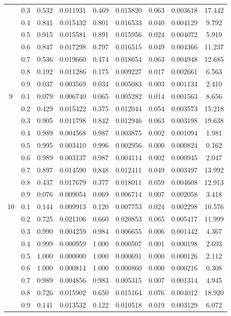 \begin{longtable}{ | c | c || c | c | c | c | c | c | c | }
 & 0.3 & 0.532 & 0.011931 & 0.469 & 0.015820 & 0.063 & 0.003618 & 17.442 \\
 & 0.4 & 0.841 & 0.015432 & 0.801 & 0.016533 & 0.040 & 0.004129 & 9.792 \\
 & 0.5 & 0.915 & 0.015581 & 0.891 & 0.015956 & 0.024 & 0.004072 & 5.919 \\
 & 0.6 & 0.847 & 0.017298 & 0.797 & 0.016515 & 0.049 & 0.004366 & 11.237 \\
 & 0.7 & 0.536 & 0.019660 & 0.474 & 0.018654 & 0.063 & 0.004948 & 12.685 \\
 & 0.8 & 0.192 & 0.011286 & 0.175 & 0.009227 & 0.017 & 0.002661 & 6.563 \\
 & 0.9 & 0.037 & 0.003569 & 0.034 & 0.005083 & 0.003 & 0.001134 & 2.410 \\
 \hline
\multirow{9}{*}{9} & 0.1 & 0.079 & 0.006740 & 0.065 & 0.005282 & 0.014 & 0.001563 & 8.656 \\
 & 0.2 & 0.429 & 0.015422 & 0.375 & 0.012044 & 0.054 & 0.003573 & 15.218 \\
 & 0.3 & 0.905 & 0.011798 & 0.842 & 0.012946 & 0.063 & 0.003198 & 19.638 \\
 & 0.4 & 0.989 & 0.004568 & 0.987 & 0.003875 & 0.002 & 0.001094 & 1.981 \\
 & 0.5 & 0.995 & 0.003410 & 0.996 & 0.002956 & 0.000 & 0.000824 & 0.162 \\
 & 0.6 & 0.989 & 0.003137 & 0.987 & 0.004114 & 0.002 & 0.000945 & 2.047 \\
 & 0.7 & 0.897 & 0.014590 & 0.848 & 0.012411 & 0.049 & 0.003497 & 13.992 \\
 & 0.8 & 0.437 & 0.017679 & 0.377 & 0.018011 & 0.059 & 0.004608 & 12.913 \\
 & 0.9 & 0.076 & 0.009054 & 0.069 & 0.006714 & 0.007 & 0.002058 & 3.418 \\
 \hline
\multirow{9}{*}{10} & 0.1 & 0.144 & 0.009913 & 0.120 & 0.007753 & 0.024 & 0.002298 & 10.576 \\
 & 0.2 & 0.725 & 0.021106 & 0.660 & 0.020853 & 0.065 & 0.005417 & 11.999 \\
 & 0.3 & 0.990 & 0.004259 & 0.984 & 0.006655 & 0.006 & 0.001442 & 4.367 \\
 & 0.4 & 0.999 & 0.000959 & 1.000 & 0.000507 & 0.001 & 0.000198 & 2.693 \\
 & 0.5 & 1.000 & 0.000000 & 1.000 & 0.000691 & 0.000 & 0.000126 & 2.112 \\
 & 0.6 & 1.000 & 0.000814 & 1.000 & 0.000860 & 0.000 & 0.000216 & 0.308 \\
 & 0.7 & 0.989 & 0.004856 & 0.983 & 0.005315 & 0.007 & 0.001314 & 4.945 \\
 & 0.8 & 0.726 & 0.015902 & 0.650 & 0.015164 & 0.076 & 0.004012 & 18.920 \\
 & 0.9 & 0.141 & 0.013532 & 0.122 & 0.010518 & 0.019 & 0.003129 & 6.072 \\
 \hline
\hline
\end{longtable}
 
